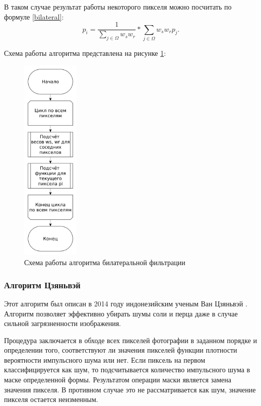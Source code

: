 В таком случае результат работы некоторого пикселя можно посчитать по формуле \ref{bilateral}:
\begin{equation}
	\label{bilateral}
	p_i = \frac{1}{\sum_{j \in \Omega}^{} w_{s}w_{r}} * \sum_{j \in \Omega}^{} w_{s}w_{r}p_j.
\end{equation}

Схема работы алгоритма представлена на рисунке \ref{fig::bilateral}:
\FloatBarrier
\begin{figure}[h]	
	\begin{center}
		\includegraphics[height=10cm]{inc/pdf/bilateral.pdf}
	\end{center}
	\captionsetup{justification=centering}
	\caption{Схема работы алгоритма билатеральной фильтрации}
	\label{fig::bilateral}
\end{figure}
\FloatBarrier

\subsubsection{Алгоритм Цзяньвэй}
Этот алгоритм был описан в 2014 году индонезийским ученым Ван Цзяньвэй \cite{color_image}.
Алгоритм позволяет эффективно убирать шумы соли и перца даже в случае сильной загрязненности изображения.

Процедура заключается в обходе всех пикселей фотографии в заданном порядке и определении того, соответствуют ли значения пикселей функции плотности вероятности импульсного шума или нет. 
Если пиксель на первом классифицируется как шум, то подсчитывается количество импульсного шума в маске определенной формы.
Результатом операции маски является замена значения пикселя.
В противном случае это не рассматривается как шум, значение пикселя остается неизменным.

